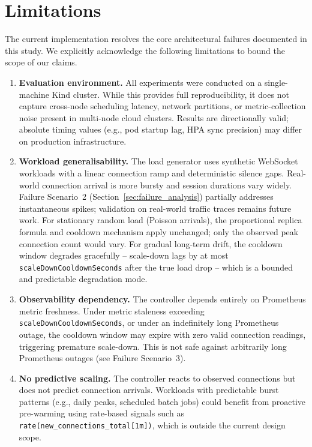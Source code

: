 \documentclass[twocolumn]{svjour3}
\begin{document}
\section{Limitations}
\label{sec:limitations}

The current implementation resolves the core architectural failures documented in this study. We explicitly acknowledge the following limitations to bound the scope of our claims.

\begin{enumerate}[leftmargin=*]

\item \textbf{Evaluation environment.} All experiments were conducted on a single-machine Kind cluster. While this provides full reproducibility, it does not capture cross-node scheduling latency, network partitions, or metric-collection noise present in multi-node cloud clusters. Results are directionally valid; absolute timing values (e.g., pod startup lag, HPA sync precision) may differ on production infrastructure.

\item \textbf{Workload generalisability.} The load generator uses synthetic WebSocket workloads with a linear connection ramp and deterministic silence gaps. Real-world connection arrival is more bursty and session durations vary widely. Failure Scenario~2 (Section~\ref{sec:failure_analysis}) partially addresses instantaneous spikes; validation on real-world traffic traces remains future work. For stationary random load (Poisson arrivals), the proportional replica formula and cooldown mechanism apply unchanged; only the observed peak connection count would vary. For gradual long-term drift, the cooldown window degrades gracefully -- scale-down lags by at most \texttt{scaleDownCooldownSeconds} after the true load drop -- which is a bounded and predictable degradation mode.

\item \textbf{Observability dependency.} The controller depends entirely on Prometheus metric freshness. Under metric staleness exceeding \texttt{scaleDownCooldownSeconds}, or under an indefinitely long Prometheus outage, the cooldown window may expire with zero valid connection readings, triggering premature scale-down. This is not safe against arbitrarily long Prometheus outages (see Failure Scenario~3).

\item \textbf{No predictive scaling.} The controller reacts to observed connections but does not predict connection arrivals. Workloads with predictable burst patterns (e.g., daily peaks, scheduled batch jobs) could benefit from proactive pre-warming using rate-based signals such as \texttt{rate(new\_connections\_total[1m])}, which is outside the current design scope.


\end{enumerate}
\end{document}
